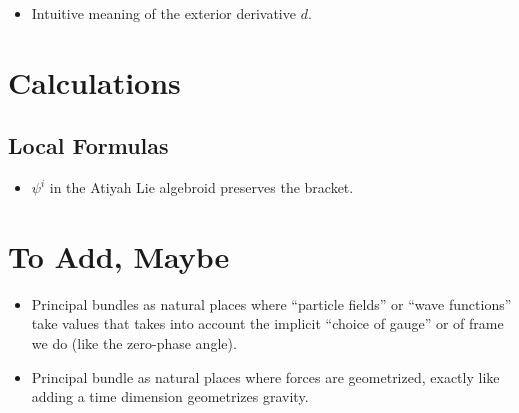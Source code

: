 \begin{itemize}
    \item Intuitive meaning of the exterior derivative $d$.
\end{itemize}

\section{Calculations}

\subsection{Local Formulas}
\begin{itemize}
    \item $\psi^i$ in the Atiyah Lie algebroid preserves the bracket.
\end{itemize}

\section{To Add, Maybe}
\begin{itemize}
    \item Principal bundles as natural places where ``particle fields'' or ``wave functions'' take values that takes into account the implicit ``choice of gauge'' or of frame we do (like the zero-phase angle).
    
    \item Principal bundle as natural places where forces are geometrized, exactly like adding a time dimension geometrizes gravity. 
\end{itemize}